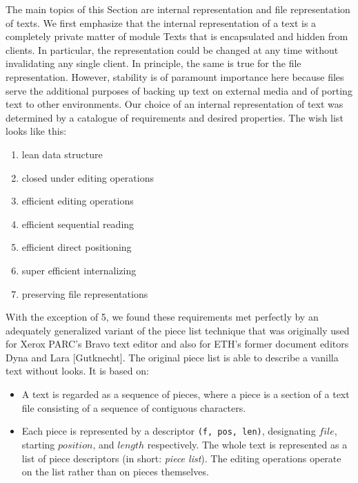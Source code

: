 The main topics of this Section are internal representation and file representation of texts. We first
emphasize that the internal representation of a text is a completely private matter of module Texts
that is encapsulated and hidden from clients. In particular, the representation could be changed at
any time without invalidating any single client. In principle, the same is true for the file
representation. However, stability is of paramount importance here because files serve the
additional purposes of backing up text on external media and of porting text to other environments.
Our choice of an internal representation of text was determined by a catalogue of requirements and
desired properties. The wish list looks like this:
\begin{enumerate}
  \item lean data structure
  \item closed under editing operations
  \item efficient editing operations
  \item efficient sequential reading
  \item efficient direct positioning
  \item super efficient internalizing
  \item preserving file representations
\end{enumerate}
With the exception of 5, we found these requirements met perfectly by an adequately generalized
variant of the piece list technique that was originally used for Xerox PARC's Bravo text editor and
also for ETH's former document editors Dyna and Lara [Gutknecht]. The original piece list is able to
describe a vanilla text without looks. It is based on:
\begin{itemize}
  \item A text is regarded as a sequence of pieces, where a piece is a section of a text file
    consisting of a sequence of contiguous characters.
  \item Each piece is represented by a descriptor \verb|(f, pos, len)|,
    designating $file$, starting $position$, and $length$ respectively.
    The whole text is represented as a list of piece descriptors (in short: \emph{piece list}).
    The editing operations operate on the list rather than on pieces themselves.
\end{itemize}

